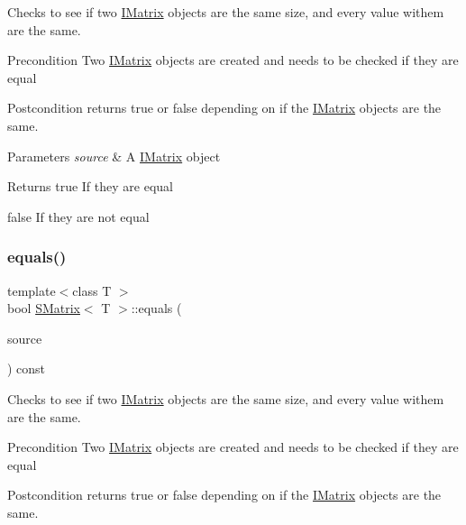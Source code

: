 Checks to see if two \mbox{\hyperlink{class_i_matrix}{I\+Matrix}} objects are the same size, and every value withem are the same. 

\begin{DoxyPrecond}{Precondition}
Two \mbox{\hyperlink{class_i_matrix}{I\+Matrix}} objects are created and needs to be checked if they are equal 
\end{DoxyPrecond}
\begin{DoxyPostcond}{Postcondition}
returns true or false depending on if the \mbox{\hyperlink{class_i_matrix}{I\+Matrix}} objects are the same.
\end{DoxyPostcond}

\begin{DoxyParams}{Parameters}
{\em source} & A \mbox{\hyperlink{class_i_matrix}{I\+Matrix}} object \\
\hline
\end{DoxyParams}
\begin{DoxyReturn}{Returns}
true If they are equal 

false If they are not equal 
\end{DoxyReturn}
\mbox{\label{class_s_matrix_a0955911949528be566ba26a734d52816}} 
\subsubsection{\texorpdfstring{equals()}{equals()}\hspace{0.1cm}{\footnotesize\ttfamily [3/6]}}
{\footnotesize\ttfamily template$<$class T $>$ \\
bool \mbox{\hyperlink{class_s_matrix}{S\+Matrix}}$<$ T $>$\+::equals (\begin{DoxyParamCaption}\item[{const \mbox{\hyperlink{class_i_matrix}{I\+Matrix}}$<$ \mbox{\hyperlink{class_l_matrix}{L\+Matrix}}$<$ T $>$, T $>$ \&}]{source }\end{DoxyParamCaption}) const}



Checks to see if two \mbox{\hyperlink{class_i_matrix}{I\+Matrix}} objects are the same size, and every value withem are the same. 

\begin{DoxyPrecond}{Precondition}
Two \mbox{\hyperlink{class_i_matrix}{I\+Matrix}} objects are created and needs to be checked if they are equal 
\end{DoxyPrecond}
\begin{DoxyPostcond}{Postcondition}
returns true or false depending on if the \mbox{\hyperlink{class_i_matrix}{I\+Matrix}} objects are the same.
\end{DoxyPostcond}

